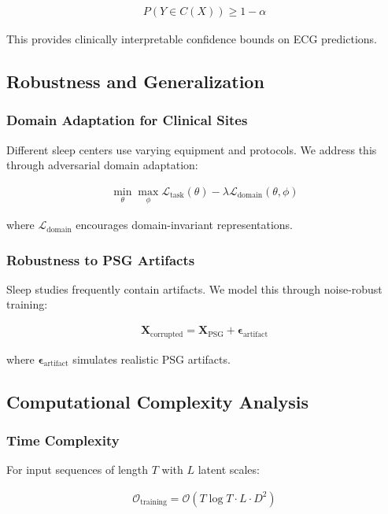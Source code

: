 \documentclass[11pt,en]{elegantpaper}
\begin{document}
\begin{align}
P(Y \in C(X)) \geq 1 - \alpha
\end{align}

This provides clinically interpretable confidence bounds on ECG predictions.

\subsection{Robustness and Generalization}

\subsubsection{Domain Adaptation for Clinical Sites}
Different sleep centers use varying equipment and protocols. We address this through adversarial domain adaptation:

\begin{align}
\min_{\theta} \max_{\phi} \mathcal{L}_{\text{task}}(\theta) - \lambda \mathcal{L}_{\text{domain}}(\theta, \phi)
\end{align}

where $\mathcal{L}_{\text{domain}}$ encourages domain-invariant representations.

\subsubsection{Robustness to PSG Artifacts}
Sleep studies frequently contain artifacts. We model this through noise-robust training:

\begin{align}
\mathbf{X}_{\text{corrupted}} = \mathbf{X}_{\text{PSG}} + \boldsymbol{\epsilon}_{\text{artifact}}
\end{align}

where $\boldsymbol{\epsilon}_{\text{artifact}}$ simulates realistic PSG artifacts.

\subsection{Computational Complexity Analysis}

\subsubsection{Time Complexity}
For input sequences of length $T$ with $L$ latent scales:

\begin{align}
\mathcal{O}_{\text{training}} = \mathcal{O}(T \log T \cdot L \cdot D^2)
\end{align}
\end{document}
